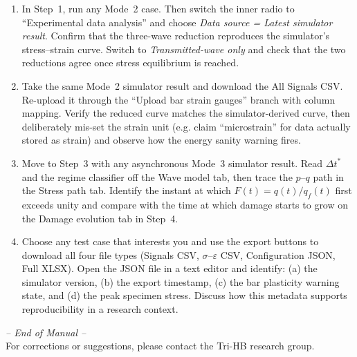 \documentclass[11pt,a4paper]{article}
\newcommand{\sig}{\sigma}
\newcommand{\eps}{\varepsilon}
\begin{document}
\begin{enumerate}[leftmargin=*, itemsep=4pt]
        verify that increasing $\sig_1$ shifts the entire curve upward by
        a constant offset \emph{without} changing peak strength. Explain
        why $\sig_1$ behaves differently from $\sig_2$ and $\sig_3$.
  \item In Step~1, run any Mode~2 case. Then switch the inner radio to
        ``Experimental data analysis'' and choose \emph{Data source = Latest
        simulator result}. Confirm that the three-wave reduction reproduces
        the simulator's stress--strain curve. Switch to \emph{Transmitted-wave
        only} and check that the two reductions agree once stress equilibrium
        is reached.
  \item Take the same Mode~2 simulator result and download the All Signals
        CSV. Re-upload it through the ``Upload bar strain gauges'' branch
        with column mapping. Verify the reduced curve matches the
        simulator-derived curve, then deliberately mis-set the strain unit
        (e.g. claim ``microstrain'' for data actually stored as strain) and
        observe how the energy sanity warning fires.
  \item Move to Step~3 with any asynchronous Mode~3 simulator result. Read
        $\Delta t^\ast$ and the regime classifier off the Wave model tab,
        then trace the $p$--$q$ path in the Stress path tab. Identify the
        instant at which $F(t) = q(t)/q_f(t)$ first exceeds unity and
        compare with the time at which damage starts to grow on the Damage
        evolution tab in Step~4.
  \item Choose any test case that interests you and use the export buttons
        to download all four file types (Signals CSV, $\sig$--$\eps$ CSV,
        Configuration JSON, Full XLSX). Open the JSON file in a text editor
        and identify: (a) the simulator version, (b) the export timestamp,
        (c) the bar plasticity warning state, and (d) the peak specimen
        stress. Discuss how this metadata supports reproducibility in a
        research context.
\end{enumerate}

\vspace{1cm}
\begin{center}
{\large\itshape\color{deepblue} -- End of Manual --}\\[6pt]
\small\color{midblue} For corrections or suggestions, please contact the Tri-HB
research group.
\end{center}
\end{document}
